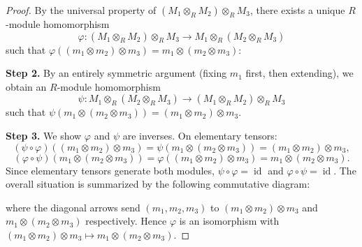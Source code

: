 \begin{proof}
    By the universal property of $(M_1 \otimes_R M_2) \otimes_R M_3$, there exists a unique $R$-module homomorphism
    \[
        \varphi: (M_1 \otimes_R M_2) \otimes_R M_3 \to M_1 \otimes_R (M_2 \otimes_R M_3)
    \]
    such that $\varphi((m_1 \otimes m_2) \otimes m_3) = m_1 \otimes (m_2 \otimes m_3)$:
    \begin{center}
    \end{center}

    \textbf{Step 2.} By an entirely symmetric argument (fixing $m_1$ first, then extending), we obtain an $R$-module homomorphism
    \[
        \psi: M_1 \otimes_R (M_2 \otimes_R M_3) \to (M_1 \otimes_R M_2) \otimes_R M_3
    \]
    such that $\psi(m_1 \otimes (m_2 \otimes m_3)) = (m_1 \otimes m_2) \otimes m_3$.

    \textbf{Step 3.} We show $\varphi$ and $\psi$ are inverses. On elementary tensors:
    \[
        (\psi \circ \varphi)((m_1 \otimes m_2) \otimes m_3) = \psi(m_1 \otimes (m_2 \otimes m_3)) = (m_1 \otimes m_2) \otimes m_3,
    \]
    \[
        (\varphi \circ \psi)(m_1 \otimes (m_2 \otimes m_3)) = \varphi((m_1 \otimes m_2) \otimes m_3) = m_1 \otimes (m_2 \otimes m_3).
    \]
    Since elementary tensors generate both modules, $\psi \circ \varphi = \operatorname{id}$ and $\varphi \circ \psi = \operatorname{id}$. The overall situation is summarized by the following commutative diagram:
    \begin{center}
    \end{center}
    where the diagonal arrows send $(m_1,m_2,m_3)$ to $(m_1\otimes m_2)\otimes m_3$ and $m_1\otimes(m_2\otimes m_3)$ respectively. Hence $\varphi$ is an isomorphism with $(m_1\otimes m_2)\otimes m_3 \mapsto m_1\otimes(m_2\otimes m_3)$.
\end{proof}

